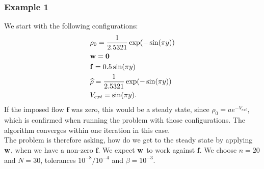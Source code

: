	\subsubsection{Example 1}
	We start with the following configurations:
	\begin{align*}
	&\rho_0 = \frac{1}{2.5321}\exp(-\sin(\pi y))\\
	&\mathbf{w} = \mathbf{0}\\
	&\mathbf{f} = 0.5\sin(\pi y)\\
	&\widehat \rho = \frac{1}{2.5321}\exp(-\sin(\pi y))\\
	&V_{ext} =  \sin(\pi y).
	\end{align*}
	If the imposed flow $\mathbf{f}$ was zero, this would be a steady state, since $\rho_0 = a e^{-V_{ext}}$, which is confirmed when running the problem with those configurations. The algorithm converges within one iteration in this case.\\
	The problem is therefore asking, how do we get to the steady state by applying $\mathbf{w}$, when we have a non-zero $\mathbf f$. We expect $\mathbf{w}$ to work against $\mathbf{f}$.
	We choose $n = 20$ and $N = 30$, tolerances $10^{-8}/10^{-4}$ and $\beta = 10^{-3}$. 
	
